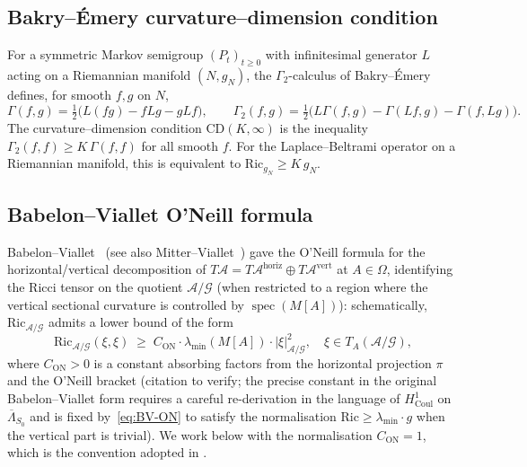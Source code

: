 \documentclass[11pt,a4paper]{amsart}
\theoremstyle{definition}
\newcommand{\abs}[1]{\left\lvert#1\right\rvert}
\newcommand{\Ric}{\mathrm{Ric}}
\newcommand{\Coul}{\mathrm{Coul}}
\DeclareMathOperator{\spec}{spec}
\begin{document}
\subsection{Bakry--\'Emery curvature--dimension condition}
For a symmetric Markov semigroup $(P_t)_{t\geq 0}$ with infinitesimal
generator $L$ acting on a Riemannian manifold $(N, g_N)$, the
$\Gamma_2$-calculus of Bakry--\'Emery~\cite{BakryEmery1985}
defines, for smooth $f, g$ on $N$,
$$
\Gamma(f,g) = \tfrac12\bigl(L(fg) - f L g - g L f\bigr),\qquad
\Gamma_2(f,g) = \tfrac12\bigl(L \Gamma(f,g) - \Gamma(L f, g) - \Gamma(f, L g)\bigr).
$$
The curvature--dimension condition $\mathrm{CD}(K,\infty)$ is the inequality
$\Gamma_2(f,f) \geq K\,\Gamma(f,f)$ for all smooth $f$. For the
Laplace--Beltrami operator on a Riemannian manifold, this is equivalent to
$\Ric_{g_N} \geq K\,g_N$.

\subsection{Babelon--Viallet O'Neill formula}
Babelon--Viallet~\cite[Eq.~(4.5)]{BabelonViallet1981} (see also
Mitter--Viallet~\cite{MitterViallet1981}) gave the O'Neill formula for the
horizontal/vertical decomposition of $T\mathcal A = T\mathcal A^\mathrm{horiz}
\oplus T\mathcal A^\mathrm{vert}$ at $A \in \Omega$, identifying the Ricci
tensor on the quotient $\mathcal A/\mathcal G$ (when restricted to a region
where the vertical sectional curvature is controlled by $\spec(M[A])$):
schematically, $\Ric_{\mathcal A/\mathcal G}$ admits a lower bound of the
form
\begin{equation}\label{eq:BV-ON}
\Ric_{\mathcal A/\mathcal G}(\xi,\xi) \;\geq\;
C_{\mathrm{ON}}\cdot \lambda_{\min}(M[A])\cdot \abs{\xi}^2_{\mathcal A/\mathcal G},
\quad \xi \in T_A(\mathcal A/\mathcal G),
\end{equation}
where $C_{\mathrm{ON}} > 0$ is a constant absorbing factors from the
horizontal projection $\pi$ and the O'Neill bracket (citation to verify;
the precise constant in the original Babelon--Viallet form requires a
careful re-derivation in the language of $H^1_{\Coul}$ on
$\overline\Lambda_{S_0}$ and is fixed by~\eqref{eq:BV-ON} to satisfy the
normalisation $\Ric \geq \lambda_{\min}\cdot g$ when the vertical part
is trivial). We work below with the normalisation $C_{\mathrm{ON}} = 1$,
which is the convention adopted in
\cite[Cor.~KR--FP--A]{RemondiereKRFP3_2026}.
\end{document}
